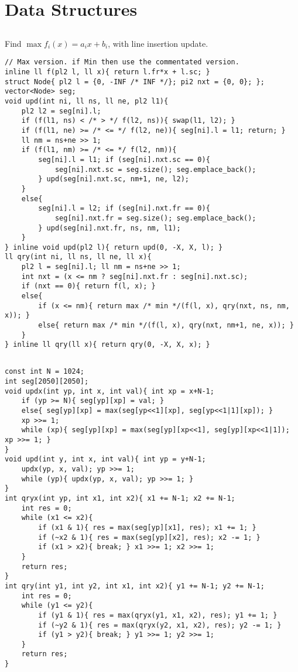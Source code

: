 \documentclass[landscape, 8pt, a4paper, oneside, twocolumn]{extarticle}
\begin{document}
\section{Data Structures}
\subsection{}
Find $\max f_i(x) = a_ix + b_i$, with line insertion update.

\begin{verbatim}
// Max version. if Min then use the commentated version.
inline ll f(pl2 l, ll x){ return l.fr*x + l.sc; }
struct Node{ pl2 l = {0, -INF /* INF */}; pi2 nxt = {0, 0}; };
vector<Node> seg;
void upd(int ni, ll ns, ll ne, pl2 l1){
    pl2 l2 = seg[ni].l;
    if (f(l1, ns) < /* > */ f(l2, ns)){ swap(l1, l2); }
    if (f(l1, ne) >= /* <= */ f(l2, ne)){ seg[ni].l = l1; return; }
    ll nm = ns+ne >> 1;
    if (f(l1, nm) >= /* <= */ f(l2, nm)){
        seg[ni].l = l1; if (seg[ni].nxt.sc == 0){
            seg[ni].nxt.sc = seg.size(); seg.emplace_back();
        } upd(seg[ni].nxt.sc, nm+1, ne, l2);
    }
    else{
        seg[ni].l = l2; if (seg[ni].nxt.fr == 0){
            seg[ni].nxt.fr = seg.size(); seg.emplace_back();
        } upd(seg[ni].nxt.fr, ns, nm, l1);
    }
} inline void upd(pl2 l){ return upd(0, -X, X, l); }
ll qry(int ni, ll ns, ll ne, ll x){
    pl2 l = seg[ni].l; ll nm = ns+ne >> 1;
    int nxt = (x <= nm ? seg[ni].nxt.fr : seg[ni].nxt.sc);
    if (nxt == 0){ return f(l, x); }
    else{
        if (x <= nm){ return max /* min */(f(l, x), qry(nxt, ns, nm, x)); }
        else{ return max /* min */(f(l, x), qry(nxt, nm+1, ne, x)); }
    }
} inline ll qry(ll x){ return qry(0, -X, X, x); }
\end{verbatim}
\subsection{}
\begin{verbatim}
const int N = 1024;
int seg[2050][2050];
void updx(int yp, int x, int val){ int xp = x+N-1;
	if (yp >= N){ seg[yp][xp] = val; }
	else{ seg[yp][xp] = max(seg[yp<<1][xp], seg[yp<<1|1][xp]); }
	xp >>= 1;
	while (xp){ seg[yp][xp] = max(seg[yp][xp<<1], seg[yp][xp<<1|1]); xp >>= 1; }
}
void upd(int y, int x, int val){ int yp = y+N-1;
	updx(yp, x, val); yp >>= 1;
	while (yp){ updx(yp, x, val); yp >>= 1; }
}
int qryx(int yp, int x1, int x2){ x1 += N-1; x2 += N-1;
	int res = 0;
	while (x1 <= x2){
		if (x1 & 1){ res = max(seg[yp][x1], res); x1 += 1; }
		if (~x2 & 1){ res = max(seg[yp][x2], res); x2 -= 1; }
		if (x1 > x2){ break; } x1 >>= 1; x2 >>= 1;
	}
	return res;
}
int qry(int y1, int y2, int x1, int x2){ y1 += N-1; y2 += N-1;
	int res = 0;
	while (y1 <= y2){
		if (y1 & 1){ res = max(qryx(y1, x1, x2), res); y1 += 1; }
		if (~y2 & 1){ res = max(qryx(y2, x1, x2), res); y2 -= 1; }
		if (y1 > y2){ break; } y1 >>= 1; y2 >>= 1;
	}
	return res;
}
\end{verbatim}
\end{document}
